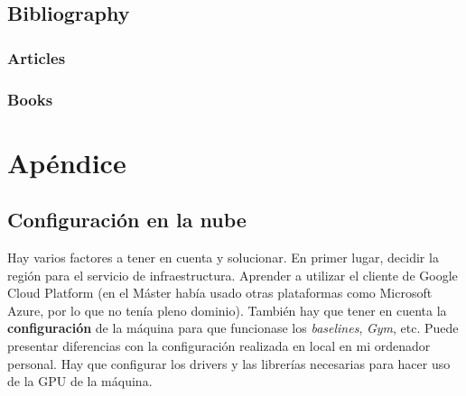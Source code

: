 \documentclass[11pt,fleqn]{book} %
\begin{document}

\chapter*{Bibliography}


\section*{Articles}
\printbibliography[heading=bibempty,type=article]


\section*{Books}
\printbibliography[heading=bibempty,type=book]


\appendix

\part{Apéndice}
\usechapterimagefalse
\chapter{Configuración en la nube}\label{sec:googlecloud}


Hay varios factores a tener en cuenta y solucionar. En primer lugar, decidir la región para el servicio de infraestructura. Aprender a utilizar el cliente de Google Cloud Platform (en el Máster había usado otras plataformas como Microsoft Azure, por lo que no tenía pleno dominio). También hay que tener en cuenta la \textbf{configuración} de la máquina para que funcionase los \textit{baselines}, \textit{Gym}, etc. Puede presentar diferencias con la configuración realizada en local en mi ordenador personal. Hay que configurar los drivers y las librerías necesarias para hacer uso de la GPU de la máquina. \\
\end{document}
